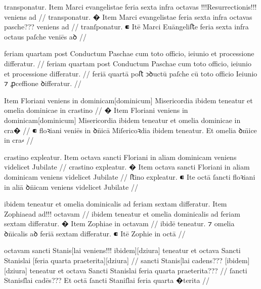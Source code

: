 \ex \bg
\gla
{}
transponatur.
{} Item Marci evangelistae feria sexta infra octavas !!!Resurrectionis!!! {}
veniens ad
//
\glRekonstrukcja
{}
transponatur.
� Item Marci evangelistae feria sexta infra octavas {} pasche???
veniens ad
//
\glU
{}
tranſponatur. ⁌ Itē Marci Euāngeliﬅe feria sexta infra octaus {} paſche veniēs aꝺ
//
\endgl
\xe



\ex \bg
\gla
{}
feriam quartam post Conductum Paschae cum toto officio,
ieiunio et processione differatur.
//
\glRekonstrukcja
{}
feriam quartam post Conductum Paschae cum toto officio,
ieiunio et processione differatur.
//
\glU
{}
feriā quartā poﬅ ↄꝺuctū paſche cū toto oﬀicio Ieiunio ⁊ ꝓceﬀione ꝺiﬀeratur.
//
\endgl
\xe



\ex \bg
\gla
{}
{} Item Floriani veniens in dominicam[dominicum] Misericordia ibidem teneatur
et omelia dominicae in crastino
//
\glRekonstrukcja
{}
� Item Floriani veniens in dominicam[dominicum] Misericordia ibidem teneatur
et omelia dominicae in cra�
//
\glU
{}
⁌ {} floꝛiani veniēs in ꝺn̄icā Miſericoꝛdia ibidem teneatur. Et omelia ꝺm̄ice in cra⸗
//
\endgl
\xe




\ex \bg
\gla
{}
crastino expleatur.
{} Item octava sancti Floriani in aliam dominicam veniens videlicet
Jubilate
//
\glRekonstrukcja
{}
crastino expleatur.
� Item octava sancti Floriani in aliam dominicam veniens videlicet
Jubilate
//
\glU
{}
ﬅino expleatur. ⁌ Ite octā ſancti floꝛiani in aliā ꝺn̄icam veniens videlicet Jubilate
//
\endgl
\xe


\ex \bg
\gla
{}
ibidem teneatur et omelia dominicalis ad feriam sextam differatur.
{} Item Zophiaead ad!!! {} octavam 
//
\glRekonstrukcja
{}
ibidem teneatur et omelia dominicalis ad feriam sextam differatur.
� Item Zophiae {} in octavam 
//
\glU
{}
ibidē teneatur. ⁊ omelia ꝺn̄icalis aꝺ feriā sextam diﬀeratur. ⁌ Itē Zophie {} in octā
//
\endgl
\xe



\ex \bg
\gla
{}
octavam sancti Stanis[lai veniens!!! {} ibidem][dziura] teneatur et octava Sancti Stanislai [feria quarta praeterita][dziura]
//
\glRekonstrukcja
{}
{} sancti Stanis[lai {} cadens??? [ibidem][dziura] teneatur et octava Sancti Stanislai feria quarta praeterita???
//
\glU
{}
{} ſancti Stanisſlai {} cadēs???   Et octā ſancti Staniſlai feria quarta �terita
//
\endgl
\xe



